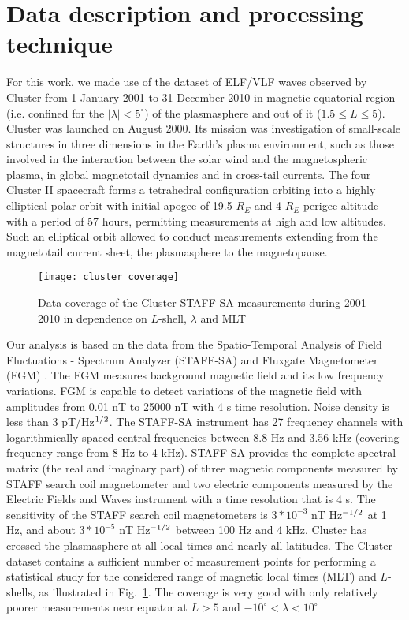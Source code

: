 \documentclass[a4paper]{article}
\begin{document}
\section*{\sc Data description and processing technique}

\indent \indent For this work, we made use of the dataset of ELF/VLF waves observed by Cluster from 1 January 2001 to 31 December 2010 in magnetic equatorial region (i.e. confined for the $|\lambda|<5^\circ$) of the plasmasphere and out of it  ($1.5\leq L\leq 5$). Cluster was launched on August 2000. Its mission was investigation of small-scale structures in three dimensions in the Earth's plasma environment, such as those involved in the interaction between the solar wind and the magnetospheric plasma, in global magnetotail dynamics and in cross-tail currents. The four Cluster II spacecraft forms a tetrahedral configuration orbiting into a highly elliptical polar orbit with initial apogee of 19.5 $R_E$ and 4 $R_E$ perigee altitude with a period of 57 hours, permitting measurements at high and low altitudes. Such an elliptical orbit allowed to conduct measurements extending from the magnetotail current sheet, the plasmasphere to the magnetopause.
\begin{figure}
    \centering
    \texttt{[image: cluster\_coverage]}
    \caption{Data coverage of the Cluster STAFF-SA measurements during 2001-2010 in dependence on $L$-shell, $\lambda$ and MLT}
    \label{fig:coverage}
\end{figure}

Our analysis is based on the data from the Spatio-Temporal Analysis of Field Fluctuations - Spectrum Analyzer (STAFF-SA) \citep{cornilleau2003first} and Fluxgate Magnetometer (FGM) \citep{balogh2001cluster,  khotyaintsev2010caabook}. The FGM measures background magnetic field and its low frequency variations. FGM is capable to detect variations of the magnetic field with amplitudes from 0.01 nT to 25000 nT with 4 s time resolution. Noise density is less than 3 pT/Hz$\vphantom{Hz}^{1/2}$. The STAFF-SA instrument has 27 frequency channels with logarithmically spaced central frequencies between 8.8 Hz and 3.56 kHz (covering frequency range from 8 Hz to 4 kHz). STAFF-SA provides the complete spectral matrix (the real and imaginary part) of three magnetic components measured by STAFF search coil magnetometer and two electric components measured by the Electric Fields and Waves instrument  \citep{gustafsson2001first} with a time resolution that is 4 s. The sensitivity of the STAFF search coil magnetometers is $3 * 10^{-3}$ nT Hz$\vphantom{Hz}^{-1/2}$ at 1 Hz, and about $3 * 10^{-5}$ nT Hz$\vphantom{Hz}^{-1/2}$ between 100 Hz and 4 kHz.  Cluster has crossed the plasmasphere at all local times and nearly all latitudes. The Cluster dataset contains a sufficient number of measurement points for performing a statistical study for the considered range of magnetic local times (MLT) and $L$-shells, as illustrated in Fig.~\ref{fig:coverage}. The coverage is very good with only relatively poorer measurements near equator at $L > 5$ and $-10^{\circ} < \lambda < 10^{\circ}$
\end{document}
